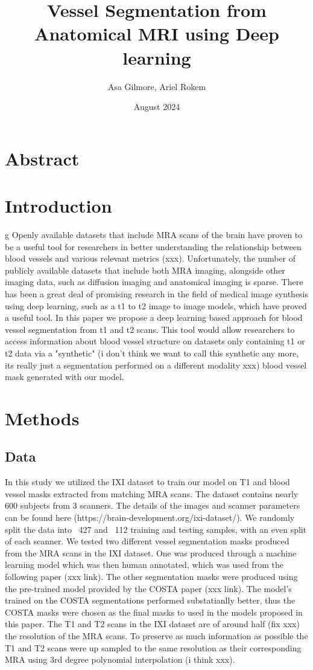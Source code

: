 \documentclass{article}
\title{Vessel Segmentation from Anatomical MRI using Deep learning}
\author{Asa Gilmore, Ariel Rokem}
\date{August 2024}
\begin{document}
\maketitle

\section{Abstract}

\section{Introduction}g
Openly available datasets that include MRA scans of the brain have proven to be a useful tool for researchers in better understanding the relationship between blood vessels and various relevant metrics (xxx). Unfortunately, the number of publicly available datasets that include both MRA imaging, alongside other imaging data, such as diffusion imaging and anatomical imaging is sparse. There has been a great deal of promising research in the field of medical image synthesis using deep learning, such as a t1 to t2 image to image models, which have proved a useful tool. In this paper we propose a deep learning based approach for blood vessel segmentation from t1 and t2 scans. This tool would allow researchers to access information about blood vessel structure on datasets only containing t1 or t2 data via a "synthetic" (i don't think we want to call this synthetic any more, its really just a segmentation performed on a different modality xxx) blood vessel mask generated with our model.

\section{Methods}

\subsection{Data}

In this study we utilized the IXI dataset to train our model on T1 and blood vessel masks extracted from matching MRA scans. The dataset contains nearly 600 subjects from 3 scanners. The details of the images and scanner parameters can be found here (https://brain-development.org/ixi-dataset/). We randomly split the data into ~427 and ~112 training and testing samples, with an even split of each scanner. We tested two different vessel segmentation masks produced from the MRA scans in the IXI dataset. One was produced through a machine learning model which was then human annotated, which was used from the following paper (xxx link). The other segmentation masks were produced using the pre-trained model provided by the COSTA paper (xxx link). The model's trained on the COSTA segmentations performed substatianlly better, thus the COSTA masks were chosen as the final masks to used in the models proposed in this paper. The T1 and T2 scans in the IXI dataset are of around half (fix xxx) the resolution of the MRA scans. To preserve as much information as possible the T1 and T2 scans were up sampled to the same resolution as their corresponding MRA using 3rd degree polynomial interpolation (i think xxx).
\end{document}
